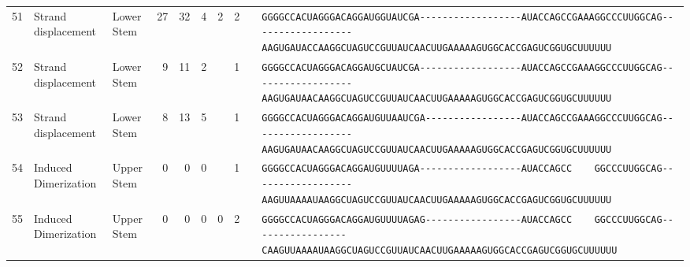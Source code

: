 \begin{tabular}{rllrrrrrcl}
 51 & Strand displacement & Lower Stem & 27 & 32 & 4 & 2 & 2 &  &
 \color{ucsfdarkgrey}\verb|GGGGCCACUAGGGACAGGAU|\color{ucsforange}\verb|GGUAUC|\color{ucsfblue}\verb|GA------------------|\color{ucsfpurple}\verb|AUACCAGCCGAAAGGCCCUUGGCAG|\color{ucsfblue}\verb|------------------AAGU|\color{ucsforange}\verb|GAUACCAA|\color{ucsfnavy}\verb|GGCUAGUCC|\color{ucsforange}\verb|GUUAUCA|\color{ucsfteal}\verb|ACUUGAAAAAGUG|\color{ucsforange}\verb|GCACCGAGUCGGUGCUUUUUU| \\

 52 & Strand displacement & Lower Stem & 9 & 11 & 2 &  & 1 &  &
 \color{ucsfdarkgrey}\verb|GGGGCCACUAGGGACAGGAU|\color{ucsforange}\verb|GCUAUC|\color{ucsfblue}\verb|GA------------------|\color{ucsfpurple}\verb|AUACCAGCCGAAAGGCCCUUGGCAG|\color{ucsfblue}\verb|------------------AAGU|\color{ucsforange}\verb|GAUAACAA|\color{ucsfnavy}\verb|GGCUAGUCC|\color{ucsforange}\verb|GUUAUCA|\color{ucsfteal}\verb|ACUUGAAAAAGUG|\color{ucsforange}\verb|GCACCGAGUCGGUGCUUUUUU| \\

 53 & Strand displacement & Lower Stem & 8 & 13 & 5 &  & 1 &  &
 \color{ucsfdarkgrey}\verb|GGGGCCACUAGGGACAGGAU|\color{ucsforange}\verb|GUUAAU|\color{ucsfblue}\verb|CGA-----------------|\color{ucsfpurple}\verb|AUACCAGCCGAAAGGCCCUUGGCAG|\color{ucsfblue}\verb|------------------AAGU|\color{ucsforange}\verb|GAUAACAA|\color{ucsfnavy}\verb|GGCUAGUCC|\color{ucsforange}\verb|GUUAUCA|\color{ucsfteal}\verb|ACUUGAAAAAGUG|\color{ucsforange}\verb|GCACCGAGUCGGUGCUUUUUU| \\

 54 & Induced Dimerization & Upper Stem & 0 & 0 & 0 &  & 1 &  &
 \color{ucsfdarkgrey}\verb|GGGGCCACUAGGGACAGGAU|\color{ucsforange}\verb|GUUUUA|\color{ucsfblue}\verb|GA------------------|\color{ucsfpurple}\verb|AUACCAGCC    GGCCCUUGGCAG|\color{ucsfblue}\verb|------------------AAGU|\color{ucsforange}\verb|UAAAAUAA|\color{ucsfnavy}\verb|GGCUAGUCC|\color{ucsforange}\verb|GUUAUCA|\color{ucsfteal}\verb|ACUUGAAAAAGUG|\color{ucsforange}\verb|GCACCGAGUCGGUGCUUUUUU| \\

 55 & Induced Dimerization & Upper Stem & 0 & 0 & 0 & 0 & 2 &  &
 \color{ucsfdarkgrey}\verb|GGGGCCACUAGGGACAGGAU|\color{ucsforange}\verb|GUUUUA|\color{ucsfblue}\verb|GAG-----------------|\color{ucsfpurple}\verb|AUACCAGCC    GGCCCUUGGCAG|\color{ucsfblue}\verb|-----------------CAAGU|\color{ucsforange}\verb|UAAAAUAA|\color{ucsfnavy}\verb|GGCUAGUCC|\color{ucsforange}\verb|GUUAUCA|\color{ucsfteal}\verb|ACUUGAAAAAGUG|\color{ucsforange}\verb|GCACCGAGUCGGUGCUUUUUU| \\


\end{tabular}
